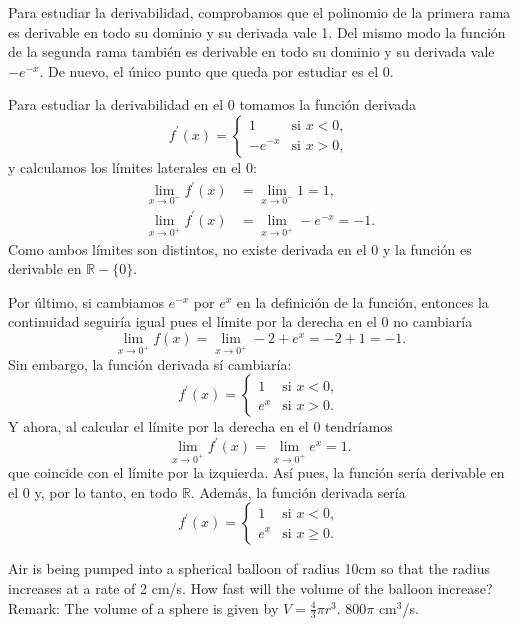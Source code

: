 {Para estudiar la derivabilidad, comprobamos que el polinomio de la primera rama es derivable en todo su dominio y su derivada vale 1. Del mismo modo la función de la segunda rama también es derivable en todo su dominio y su derivada vale $-e^{-x}$. De nuevo, el único punto que queda por estudiar es el 0.

Para estudiar la derivabilidad en el 0 tomamos la función derivada
\[
f^{\prime }(x)=
\begin{cases}
1 & \mbox{si $x<0$}, \\
-e^{-x} & \mbox{si $x>0$},
\end{cases}
\]
y calculamos los límites laterales en el 0:
\begin{align*}
\lim_{x\rightarrow 0^{-}}f^{\prime }(x) &= \lim_{x\rightarrow 0^{-}}1=1, \\
\lim_{x\rightarrow 0^{+}}f^{\prime }(x) &= \lim_{x\rightarrow 0^{+}}-e^{-x}=-1.
\end{align*}
Como ambos límites son distintos, no existe derivada en el 0 y la función es derivable en $\mathbb{R}-\{0\}$.

Por último, si cambiamos $e^{-x}$ por $e^{x}$ en la definición de la función, entonces la continuidad seguiría igual pues el límite por la derecha en el 0 no cambiaría
\[
\lim_{x\rightarrow 0^{+}}f(x) = \lim_{x\rightarrow 0^{+}}-2+e^{x}=-2+1=-1.
\]
Sin embargo, la función derivada sí cambiaría:
\[
f^{\prime }(x)=
\begin{cases}
1 & \mbox{si $x<0$}, \\
e^{x} & \mbox{si $x>0$}.
\end{cases}
\]
Y ahora, al calcular el límite por la derecha en el 0 tendríamos
\[
\lim_{x\rightarrow 0^{+}}f^{\prime }(x) = \lim_{x\rightarrow 0^{+}}e^{x}=1.
\]
que coincide con el límite por la izquierda. Así pues, la función sería derivable en el 0 y, por lo tanto, en todo $\mathbb{R}$.
Además, la función derivada sería
\[
f^{\prime }(x)=
\begin{cases}
1 & \mbox{si $x<0$}, \\
e^{x} & \mbox{si $x\geq 0$}.
\end{cases}
\]
}


{Air is being pumped into a spherical balloon of radius 10cm so that the radius increases at a rate of 2 cm/s.
How fast will the volume of the balloon increase?\\
Remark: The volume of a sphere is given by $V=\frac{4}{3}\pi r^3$.
}
{$800\pi$ cm$^3$/s.
}
{
}


